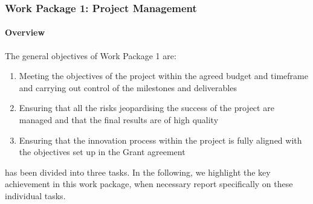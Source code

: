 \subsubsection{Work Package 1: Project Management}


\paragraph{Overview}


The general objectives of Work Package 1 are:

\begin{enumerate}
\item{Meeting the objectives of the project within the agreed budget and timeframe and carrying out control of the milestones and deliverables}
\item{Ensuring that all the risks jeopardising the success of the project are managed and that the final results are of high quality}
\item{Ensuring that the innovation process within the project is fully aligned with the objectives set up in the Grant agreement}
\end{enumerate}

 has been divided into three tasks. In the
following, we highlight the key achievement in this work package, when
necessary report specifically on these individual tasks.


